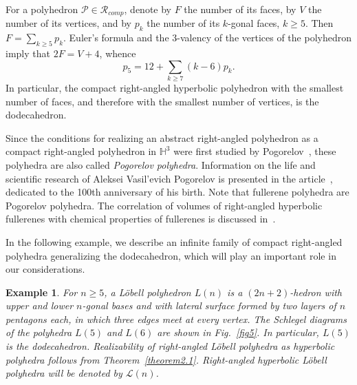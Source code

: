 \documentclass{amsart}
\newtheorem{example}{Example}[section]
\begin{document}
For a polyhedron $\mathcal P \in \mathcal R_{comp}$, denote by $F$ the number of its faces, by $V$ the number of its vertices, and by $p_k$ the number of its $k$-gonal faces, $k \geq 5$. Then $F = \sum_{k\geq 5} p_k$. Euler's formula and the 3-valency of the vertices of the polyhedron imply that $2F = V + 4$, whence
\begin{equation} \label{eqn4}
p_5 = 12 + \sum_{k \geq 7} (k-6) p_k. 
\end{equation} 
In particular, the compact right-angled hyperbolic polyhedron with the smallest number of faces, and therefore with the smallest number of vertices, is the dodecahedron.
	
Since the conditions for realizing an abstract right-angled polyhedron as a compact right-angled polyhedron in $\mathbb{H}^3$ were first studied by Pogorelov~\cite{Pog}, these polyhedra are also called \textit{Pogorelov polyhedra}. Information on the life and scientific research of Aleksei Vasil'evich Pogorelov is presented in the article~\cite{BVI}, dedicated to the 100th anniversary of his birth. Note that fullerene polyhedra are Pogorelov polyhedra. The correlation of volumes of right-angled hyperbolic fullerenes with chemical properties of fullerenes is discussed in~\cite{EV20-1}.
		
In the following example, we describe an infinite family of compact right-angled polyhedra generalizing the dodecahedron, which will play an important role in our considerations.
	
\begin{example} \cite{Ves87} \label{ex:lobell} 
{\rm 
For $n \geq 5$, a \textit{L\"obell polyhedron} $L(n)$ is a $(2n+2)$-hedron with upper and lower $n$-gonal bases and with lateral surface formed by two layers of $n$ pentagons each, in which three edges meet at every vertex. The Schlegel diagrams of the polyhedra $L(5)$ and $L(6)$ are shown in Fig.~\ref{fig5}. In particular, $L(5)$ is the dodecahedron. Realizability of right-angled L\"obell polyhedra as hyperbolic polyhedra follows from Theorem~\ref{theorem2.1}. Right-angled hyperbolic L\"obell polyhedra will be denoted by $\mathcal L(n)$.
}	
\end{example}
\end{document}
